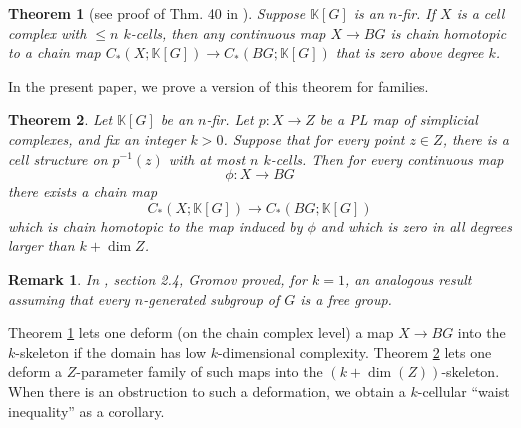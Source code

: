 \documentclass[11pt,letterpaper]{amsart}
\newtheorem{theorem}{Theorem}
\newtheorem*{remark}{Remark}
\begin{document}


\begin{theorem}[see proof of Thm. 40 in \cite{avramididelzanthyperbolic}]
\label{essentialtheorem}
Suppose $\mathbb K[G]$ is an $n$-fir.
If $X$ is a cell complex with $\leq n$ $k$-cells, then any continuous map $X\rightarrow BG$ is chain homotopic to a chain map $C_*(X;\mathbb K[G])\rightarrow C_*(BG;\mathbb K[G])$ that is zero above degree $k$.  
\end{theorem}

In the present paper, we prove a version of this theorem for families.




\begin{theorem}
\label{maptheorem}
 Let $\mathbb K[G]$ be an $n$-fir. Let $p:X\rightarrow Z$ be a PL map of simplicial complexes, and fix an integer $k>0$. Suppose that for every point $z\in Z$, there is a cell structure on $p^{-1}(z)$ with at most $n$ $k$-cells.  Then for every continuous map 
 $$
 \phi:X\rightarrow BG
 $$ 
 there exists a chain map 
 $$
 C_*(X;\mathbb K[G])\rightarrow C_*(BG;\mathbb K[G])
 $$
 which is chain homotopic to the map induced by $\phi$ and which is zero in all degrees larger than $k+\dim Z$. %
\end{theorem}
\begin{remark}
In \cite{gromovexpanders}, section 2.4, Gromov proved, for $k=1$, an analogous result assuming that every $n$-generated subgroup of $G$ is a free group.
\end{remark}
Theorem \ref{essentialtheorem} lets one deform (on the chain complex level) a map $X\rightarrow BG$ into the $k$-skeleton if the domain has low $k$-dimensional complexity. Theorem \ref{maptheorem} lets one deform a $Z$-parameter family of such maps into the $(k+\dim(Z))$-skeleton. When there is an obstruction to such a deformation, we obtain a $k$-cellular ``waist inequality'' as a corollary.
\end{document}
